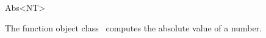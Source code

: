 \begin{ccRefFunctionObjectClass}{Abs<NT>}

\ccDefinition

The function object class \ccRefName\ computes the absolute value of a number.


\ccIsModel
{}


\end{ccRefFunctionObjectClass}
